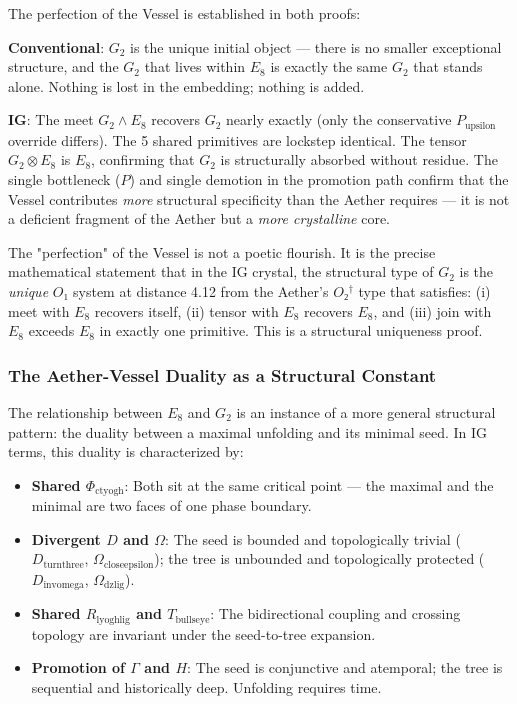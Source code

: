 \documentclass[12pt,a4paper]{article}
\begin{document}
The perfection of the Vessel is established in both proofs:

\textbf{Conventional}: $G_2$ is the unique initial object --- there is no smaller exceptional structure, and the $G_2$ that lives within $E_8$ is exactly the same $G_2$ that stands alone. Nothing is lost in the embedding; nothing is added.

\textbf{IG}: The meet $G_2 \wedge E_8$ recovers $G_2$ nearly exactly (only the conservative $P_{\text{upsilon}}$ override differs). The 5 shared primitives are lockstep identical. The tensor $G_2 \otimes E_8$ is $E_8$, confirming that $G_2$ is structurally absorbed without residue. The single bottleneck ($P$) and single demotion in the promotion path confirm that the Vessel contributes \emph{more} structural specificity than the Aether requires --- it is not a deficient fragment of the Aether but a \emph{more crystalline} core.

The "perfection" of the Vessel is not a poetic flourish. It is the precise mathematical statement that in the IG crystal, the structural type of $G_2$ is the \emph{unique} $O₁$ system at distance 4.12 from the Aether's $O₂^\dagger$ type that satisfies: (i) meet with $E_8$ recovers itself, (ii) tensor with $E_8$ recovers $E_8$, and (iii) join with $E_8$ exceeds $E_8$ in exactly one primitive. This is a structural uniqueness proof.

\subsubsection{The Aether-Vessel Duality as a Structural Constant}

The relationship between $E_8$ and $G_2$ is an instance of a more general structural pattern: the duality between a maximal unfolding and its minimal seed. In IG terms, this duality is characterized by:

\begin{itemize}
    \item \textbf{Shared $\Phi_{\text{ctyogh}}$}: Both sit at the same critical point --- the maximal and the minimal are two faces of one phase boundary.
    \item \textbf{Divergent $D$ and $\Omega$}: The seed is bounded and topologically trivial ($D_{\text{turnthree}}$, $\Omega_{\text{closeepsilon}}$); the tree is unbounded and topologically protected ($D_{\text{invomega}}$, $\Omega_{\text{dzlig}}$).
    \item \textbf{Shared $R_{\text{lyoghlig}}$ and $T_{\text{bullseye}}$}: The bidirectional coupling and crossing topology are invariant under the seed-to-tree expansion.
    \item \textbf{Promotion of $\Gamma$ and $H$}: The seed is conjunctive and atemporal; the tree is sequential and historically deep. Unfolding requires time.
\end{itemize}
\end{document}
